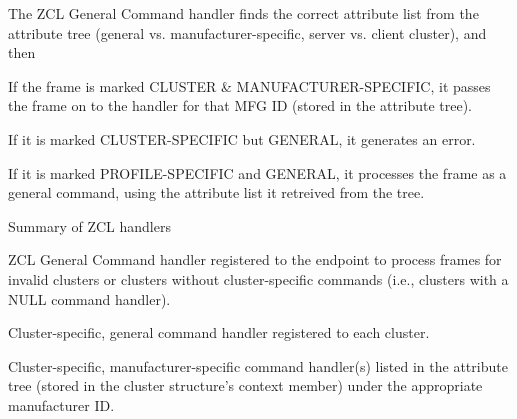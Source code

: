 The Z\-C\-L General Command handler finds the correct attribute list from the attribute tree (general vs. manufacturer-\/specific, server vs. client cluster), and then
\begin{DoxyItemize}
\item If the frame is marked C\-L\-U\-S\-T\-E\-R \& M\-A\-N\-U\-F\-A\-C\-T\-U\-R\-E\-R-\/\-S\-P\-E\-C\-I\-F\-I\-C, it passes the frame on to the handler for that M\-F\-G I\-D (stored in the attribute tree).
\item If it is marked C\-L\-U\-S\-T\-E\-R-\/\-S\-P\-E\-C\-I\-F\-I\-C but G\-E\-N\-E\-R\-A\-L, it generates an error.
\item If it is marked P\-R\-O\-F\-I\-L\-E-\/\-S\-P\-E\-C\-I\-F\-I\-C and G\-E\-N\-E\-R\-A\-L, it processes the frame as a general command, using the attribute list it retreived from the tree.
\end{DoxyItemize}

\begin{DoxyParagraph}{Summary of Z\-C\-L handlers}

\begin{DoxyItemize}
\item Z\-C\-L General Command handler registered to the endpoint to process frames for invalid clusters or clusters without cluster-\/specific commands (i.\-e., clusters with a N\-U\-L\-L command handler).
\item Cluster-\/specific, general command handler registered to each cluster.
\item Cluster-\/specific, manufacturer-\/specific command handler(s) listed in the attribute tree (stored in the cluster structure's context member) under the appropriate manufacturer I\-D. 
\end{DoxyItemize}
\end{DoxyParagraph}
